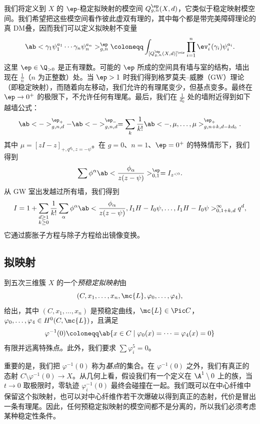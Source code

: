 我们将定义到 \(X\) 的 \(\ep\)-稳定拟映射的模空间 \(Q_{g,n}^{\ep}(X, d)\)，它类似于稳定映射模空间。我们希望把这些模空间看作彼此虚双有理的，其中每个都是带完美障碍理论的真 DM叠，因而我们可以定义拟映射不变量
\[ \ab< \gamma_1 \psi_1^{a_1} \cdots \gamma_n \psi_n^{a_n}>_{g,n}^{\ep} \coloneqq \int_{[Q_{g,n}^{\ep}(X,d)]^{\vir}} \prod_{i=1}^n \ev_i^*(\gamma_i) \psi_i^{a_i}. \]
这里 \(\ep \in \Q_{>0}\) 是正有理数。可能的 \(\ep\) 所成的空间具有墙与室的结构，墙出现在 \(\frac{1}{n}\)（\(n\) 为正整数）处。当 \(\ep > 1\) 时我们得到格罗莫夫–威滕（GW）理论（即稳定映射），而随着向左移动，我们允许的有理尾变少，但基点变多。最终在 \(\ep \to 0^+\) 的极限下，不允许任何有理尾。最后，我们在 \(\frac{1}{d_0}\) 处的墙附近得到如下越墙公式：
\[ \ab<->_{g,n,d}^{\ep_+} - \ab<->_{g,n,d}^{\ep_-} = \sum_{k} \frac{1}{k!} \ab<-, \mu, \ldots, \mu>_{g,n+k, d-kd_0}^{\ep_+}. \]
其中 \(\mu = [zI-z]_{+, q^{d_0}, z=-\psi}\)。在 \(g = 0\)、\(n = 1\)、\(\ep = 0^+\) 的特殊情形下，我们得到
\[ \sum \phi^{\alpha} \ab<\frac{\phi_{\alpha}}{z(z-\psi)}>^{\ep}_{0,1} = I_{z^{<0}}. \]
从 GW 室出发越过所有墙，我们得到
\[ I = 1 + \sum_{\substack{d \geq 1 \\ k \geq 0}} \frac{1}{k!} \sum_{\alpha} \phi^{\alpha} \ab< \frac{\phi_{\alpha}}{z(z-\psi)}, I_1 H - I_0 \psi, \ldots, I_1 H - I_0 \psi>_{0,1+k,d}^{\infty} q^d, \]
它通过膨胀子方程与除子方程给出镜像变换。

\subsection{拟映射}%
\label{sub:Quasimaps}

\begin{defn}
    到五次三维簇 \(X\) 的一个\textit{预稳定拟映射}由
    \[(C, x_1, \ldots, x_n, \mc{L}, \varphi_0, \ldots, \varphi_4),\] 
    给出，其中 \((C, x_1, \ldots, x_n)\) 是预稳定曲线，\(\mc{L} \in \Pic C\)，\(\varphi_0, \ldots, \varphi_4 \in H^0(C, \mc{L})\)，且满足
    \[ \varphi^{-1}(0) \coloneqq \ab\{x \in C \mid \varphi_0(x) = \cdots = \varphi_4(x) = 0 \} \]
    有限并远离特殊点。此外，我们要求 \(\sum \varphi_i^5 = 0\)。
\end{defn}

重要的是，我们把 \(\varphi^{-1}(0)\) 称为\textit{基点}的集合。在 \(\varphi^{-1}(0)\) 之外，我们有真正的态射 \(C \setminus \varphi^{-1}(0) \to X\)。从几何上看，假设我们有一个定义在 \(\A^1 \setminus 0\) 上的族，当 \(t \to 0\) 取极限时，零轨迹 \(\varphi_i^{-1}(0)\) 最终会碰撞在一起。我们既可以在中心纤维中保留这个拟映射，也可以对中心纤维作若干次爆破以得到真正的态射，代价是冒出一条有理尾。因此，任何预稳定拟映射的模空间都不是分离的，所以我们必须考虑某种稳定性条件。

